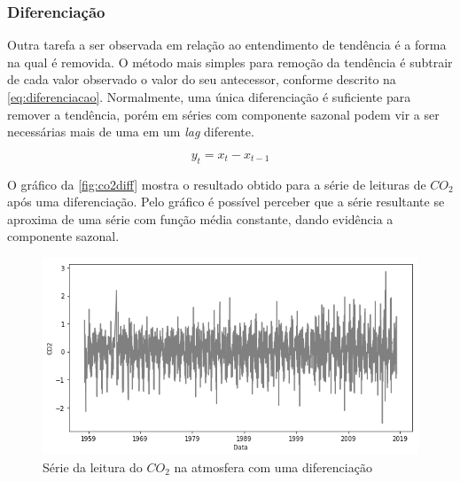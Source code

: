 \documentclass[
    12pt,
    oneside,
    a4paper,
    english,
    brazil
]{abntex2}
\begin{document}
\subsubsection{Diferenciação}\label{sec:diff}

Outra tarefa a ser observada em relação  ao entendimento de tendência é a forma
na qual é removida. O método mais  simples para remoção da tendência é subtrair
de  cada valor  observado  o  valor do  seu  antecessor,  conforme descrito  na
\autoref{eq:diferenciacao}. Normalmente,  uma única diferenciação  é suficiente
para remover  a tendência, porém em  séries com componente sazonal  podem vir a
ser necessárias mais de uma em um \textit{lag} diferente.

\begin{equation}
    \label{eq:diferenciacao}
    y_t = x_t - x_{t-1}
\end{equation}


O gráfico  da \autoref{fig:co2diff} mostra o  resultado obtido para a  série de
leituras de $CO_2$ após uma diferenciação.
Pelo gráfico  é possível  perceber que  a série resultante  se aproxima  de uma
série com função média constante, dando evidência a componente sazonal.


\begin{figure}
    \centering
    \caption{Série da leitura do $CO_2$ na atmosfera com uma
        diferenciação}\label{fig:co2diff}
    \includegraphics[width=.6\linewidth]{images/co2_diff.png}
\end{figure}
\end{document}
